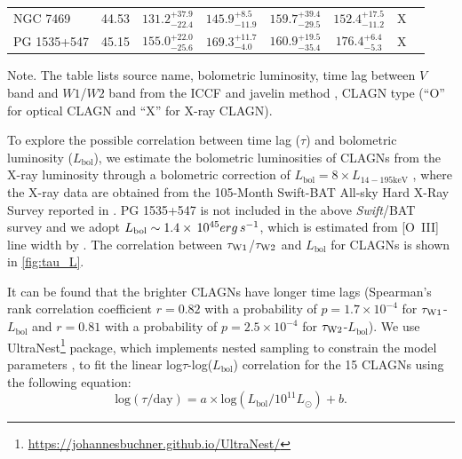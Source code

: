 \documentclass[linenumbers]{aastex631}
\newcommand{\bat}{{\small {\it Swift}/BAT}}
\begin{document}
\begin{table}
\begin{center}
\begin{tabular}{lccccccc}
NGC 7469 & 44.53 & $131.2_{-22.4}^{+37.9}$ & $145.9_{-11.9}^{+8.5}$ & $159.7_{-29.5}^{+39.4}$ & $152.4_{-11.2}^{+17.5}$ & X \\
PG 1535+547 & 45.15 & $155.0_{-25.6}^{+22.0}$ & $169.3_{-4.0}^{+11.7}$ & $160.9_{-35.4}^{+19.5}$ & $176.4_{-5.3}^{+6.4}$ & X \\
\hline\hline
\end{tabular}
\end{center}
Note. The table lists source name, bolometric luminosity, time lag between $V$ band and $W1$/$W2$ band from the ICCF and {\sc javelin} method , CLAGN type (``O'' for optical CLAGN and ``X'' for X-ray CLAGN). 
\end{table}


To explore the possible correlation between time lag ($\tau$) and bolometric luminosity ($L_\mathrm{bol}$), we estimate the bolometric luminosities of CLAGNs from the X-ray luminosity through a bolometric correction of $L_{\mathrm{bol}}=8 \times L_{\mathrm{14-195 keV }}$ \citep[e.g.,][]{2009MNRAS.392.1124V}, where the X-ray data are obtained from the 105-Month Swift-BAT All-sky Hard X-Ray Survey reported in \citet{2018ApJS..235....4O}. PG 1535+547 is not included in the above \bat\, survey and we adopt $L_{\mathrm{\rm bol}}\sim 1.4\times \, 10^{45} erg\, s^{-1}$, which is estimated from [O~{\small III}] line width by \citet{2006ApJ...653..137Z}. The correlation between $\tau_{\rm{W1}}$/$\tau_{\rm{W2}}$ and $L_\mathrm{bol}$ for CLAGNs is shown in \autoref{fig:tau_L}.

It can be found that the brighter CLAGNs have longer time lags (Spearman's rank correlation coefficient $r=0.82$ with a probability of $p=1.7\times10^{-4}$ for $\tau_{\rm{W1}}$-$L_\mathrm{bol}$ and $r=0.81$ with a probability of $p=2.5\times10^{-4}$ for $\tau_{\rm{W2}}$-$L_\mathrm{bol}$). We use UltraNest\footnote{\url{https://johannesbuchner.github.io/UltraNest/}} package, which implements nested sampling to constrain the model parameters \citep{2021JOSS....6.3001B}, to fit the linear log$\tau$-log($L_{\mathrm{bol}}$) correlation for the 15 CLAGNs using the following equation: 
\begin{equation}
\mathrm{log}(\tau/\mathrm{day})=a\times\mathrm{log}(L_{\mathrm{bol}}/10^{11} L_{\odot})+b.
\end{equation}
\end{document}
